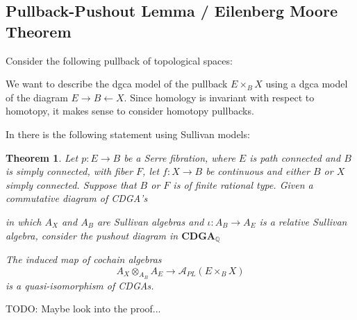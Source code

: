 \documentclass{scrartcl}
\theoremstyle{plain}
\newtheorem{theorem}{Theorem}[section]
\theoremstyle{definition}
\newcommand{\Q}{\mathbb Q}
\newcommand{\Apl}{\mathcal A_{PL}}
\newcommand{\from}{\leftarrow}
\begin{document}
\subsection{Pullback-Pushout Lemma / Eilenberg Moore Theorem}\label{subsec:eilenberg_moore}
Consider the following pullback of topological spaces:
\begin{center}
\end{center}

We want to describe the dgca model of the pullback $E\times_B X$ using a dgca model of the diagram $E\to B\from X$. Since homology is invariant with respect to homotopy, it makes sense to consider homotopy pullbacks. 

In \cite[15.8]{hess2007rational} there is the following statement using Sullivan models:
\begin{theorem}\label{thm:pullback-pushout-sullivan}
    Let $p\colon E\to B$ be a Serre fibration, where $E$ is path connected and $B$ is simply connected, with fiber $F$, let $f\colon X\to B$ be continuous and either $B$ or $X$ simply connected. Suppose that $B$ or $F$ is of finite rational type. Given a commutative diagram of CDGA's
    \begin{center}
    \end{center}
    in which $A_X$ and $A_B$ are Sullivan algebras and $\iota\colon A_B\to A_E$ is a relative Sullivan algebra, consider the pushout diagram in $\mathbf{CDGA}_\Q$
    \begin{center}
    \end{center}
    The induced map of cochain algebras 
    $$A_X\otimes_{A_B} A_E \to \Apl(E\times_B X)$$
    is a quasi-isomorphism of CDGAs.
\end{theorem}
TODO: Maybe look into the proof...
\end{document}
